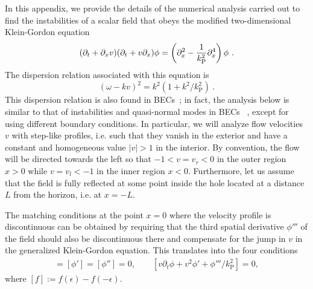 \documentclass[11pt,a4paper]{article}
\begin{document}
In this appendix, we provide the details of the numerical analysis carried out to find the instabilities of
a scalar  field  that obeys the modified two-dimensional Klein-Gordon equation
\begin{equation}
(\partial_t +\partial_x v)(\partial_t +v \partial_x) \phi = 
\left(\partial_x^2 - {1 \over k_\text{P}^2} \partial_x^4 \right) \phi~.
\end{equation}
%
The dispersion relation associated with this equation is
%
\begin{equation}
(\omega- k v)^2 = k^2 \left(1+ {k^2 / k_\text{P}^2}\right)~.
\label{eq:disp-append}
\end{equation}
%
This dispersion relation is also found in BECs~\cite{garay-PRL,garay-PRA}; in fact, the analysis below is similar to that of instabilities and quasi-normal modes in BECs ~\cite{cano-barcelo,Barcelo:2007ru}, except for using different boundary conditions. In particular, we will analyze flow velocities $v$ with step-like profiles, i.e. such that they vanish in the exterior and have a constant and homogeneous value $|v|>1$ in the
interior. By convention, the flow will be directed towards the left so that
$-1<v=v_r<0$ in the outer region $x>0$ while $v=v_l<-1$ in the inner region
$x<0$.  Furthermore, let us assume that the field is fully reflected at
some point inside the hole located at a distance $L$ from the horizon, i.e. at
$x=-L$.
 
The matching conditions at the point $x=0$ where the
velocity profile is discontinuous can be obtained by requiring that the third spatial derivative
$\phi'''$ of the field should also be discontinuous there and compensate for the
jump in $v$ in the generalized Klein-Gordon equation. This translates into the four
conditions
\begin{align}
[\phi]=[\phi']=[\phi'']=0,\qquad [v\partial_t \phi+v^2\phi'+\phi'''/k_\text{P}^2]=0,
\label{matching-cond}
\end{align}
where $[f]:=f(\epsilon)-f(-\epsilon)$.
\end{document}
